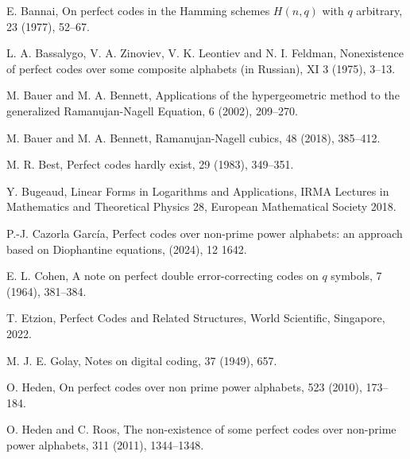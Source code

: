 \documentclass{amsart}
\begin{document}
{\begin{thebibliography}{}
E. Bannai,
\newblock On perfect codes in the Hamming schemes
$H(n, q)$ with $q$ arbitrary,
 23 (1977), 52--67.

L. A. Bassalygo, V. A. Zinoviev, V. K. Leontiev and N. I. Feldman,
\newblock Nonexistence of perfect codes over some composite alphabets (in Russian),
  XI 3 (1975), 3--13.

M. Bauer and M. A. Bennett,
\newblock Applications of the hypergeometric method
to the generalized Ramanujan-Nagell Equation,
 6 (2002), 209--270.

M. Bauer and M. A. Bennett,
\newblock Ramanujan-Nagell cubics,
 48 (2018), 385--412.

M. R. Best,
\newblock Perfect codes hardly exist,
 29 (1983), 349--351.

Y. Bugeaud,
\newblock Linear Forms in Logarithms and Applications,
\newblock IRMA Lectures in Mathematics and Theoretical Physics 28,
\newblock European Mathematical Society 2018.

P.-J. Cazorla García, 
\newblock Perfect codes over non-prime power alphabets: an approach based on Diophantine equations,
(2024), 12 1642. 

E. L. Cohen,
\newblock A note on perfect double error-correcting codes on $q$ symbols,
 7 (1964), 381--384.

T. Etzion,
\newblock Perfect Codes and Related Structures,
\newblock World Scientific, Singapore, 2022.


 M. J. E. Golay,
 \newblock Notes on digital coding,
   37 (1949), 657.
 
O. Heden,
\newblock On perfect codes over non prime power alphabets,
 523 (2010), 173--184.

O. Heden and C. Roos,
\newblock The non-existence of some perfect codes over non-prime power alphabets,
 311 (2011), 1344--1348.


\end{thebibliography}}
\end{document}
